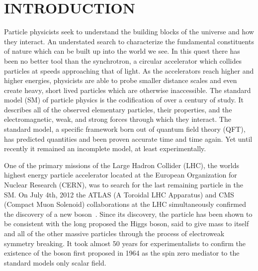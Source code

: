 %
%
%



\pagestyle{plain} %
\setcounter{page}{1}


\chapter{\texorpdfstring{\uppercase {Introduction}}{Introduction}}
\begin{comment}
1) Physics/colliders
2) Standard model
3) Higgs
4) This dissertation toppic
5) Organization
\end{comment}

Particle physicists seek to understand the building blocks of the universe and how they interact.
An understated search to characterize the fundamental constituents of nature which can be built up into the world we see.
In this quest there has been no better tool than the synchrotron, a circular accelerator which collides particles at speeds approaching that of light.
As the accelerators reach higher and higher energies, physicists are able to probe smaller distance scales and even create heavy, short lived particles which are otherwise inaccessible.
The standard model (SM) of particle physics is the codification of over a century of study.
It describes all of the observed elementary particles, their properties, and the electromagnetic, weak, and strong forces through which they interact.
The standard model, a specific framework born out of quantum field theory (QFT), has predicted quantities and been proven accurate time and time again.
Yet until recently it remained an incomplete model, at least experimentally.

One of the primary missions of the Large Hadron Collider (LHC), the worlds highest energy particle accelerator located at the European Organization for Nuclear Research (CERN), was to search for the last remaining particle in the SM.
On July 4th, 2012 the ATLAS (A Toroidal LHC Apparatus) and CMS (Compact Muon Solenoid) collaborations at the LHC simultaneously confirmed the discovery of a new boson~\cite{20121,201230}.
Since its discovery, the particle has been shown to be consistent with the long proposed the Higgs boson, said to give mass to itself and all of the other massive particles through the process of electroweak symmetry breaking.
It took almost 50 years for experimentalists to confirm the existence of the boson first proposed in 1964 as the spin zero mediator to the standard models only scalar field.

